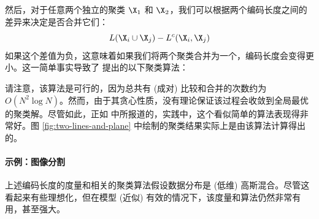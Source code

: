 \documentclass[../../book-main.tex]{subfiles}
\begin{document}
然后，对于任意两个独立的聚类 $\X_1$ 和 $\X_2$，我们可以根据两个编码长度之间的差异来决定是否合并它们：
\begin{equation}
    L(\X_i\cup \X_j) - L^c(\X_i, \X_j) 
\end{equation}
如果这个差值为负，这意味着如果我们将两个聚类合并为一个，编码长度会变得更小。这一简单事实导致了 \cite{ma2007segmentation} 提出的以下聚类算法：
\begin{algorithm}
    \caption{编码长度成对最速下降法}\label{alg:steepest_descent_coding_length}
    \begin{algorithmic}[1]

             
                 
                    \State{\Return{\(\cC\)}} 
                \Else
                     
                     
                \EndIf
            \EndWhile
            \State{\Return{\(\cC\)}}  
        \EndProcedure
    \end{algorithmic}
\end{algorithm}

请注意，该算法是可行的，因为总共有 (成对) 比较和合并的次数约为 \(O(N^2\log N)\)。然而，由于其贪心性质，没有理论保证该过程会收敛到全局最优的聚类解。尽管如此，正如 \cite{ma2007segmentation} 中所报道的，实践中，这个看似简单的算法表现得非常好。图 \ref{fig:two-lines-and-plane} 中绘制的聚类结果实际上是由该算法计算得出的。


\paragraph{示例：图像分割} 上述编码长度的度量和相关的聚类算法假设数据分布是 (低维) 高斯混合。尽管这看起来有些理想化，但在模型 (近似) 有效的情况下，该度量和算法仍然非常有用，甚至强大。
\end{document}
